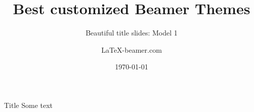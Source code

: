 \documentclass{congresso_eng_quimica}
\title{Best customized Beamer Themes}
\subtitle{Beautiful title slides: Model 1}
\author{LaTeX-beamer.com}
\date{\today}
\institute{Your Affiliation}
\begin{document}
\maketitle

\begin{frame}{\center Title}
    Some text
\end{frame}

\begin{frame}
\end{frame}

\end{document}

